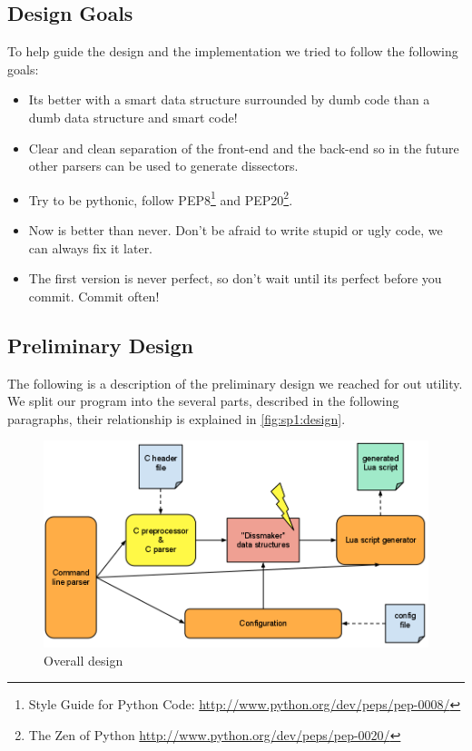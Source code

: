 \subsection{Design Goals}
To help guide the design and the implementation we tried to follow the
following goals:
\begin{itemize}
	\item Its better with a smart data structure surrounded by dumb code than
		a dumb data structure and smart code!
	\item Clear and clean separation of the front-end and the back-end so in the
		future other parsers can be used to generate dissectors.
	\item Try to be pythonic, follow
		PEP8\footnote{Style Guide for Python Code: \url{http://www.python.org/dev/peps/pep-0008/}} and
		PEP20\footnote{The Zen of Python \url{http://www.python.org/dev/peps/pep-0020/}}.
	\item Now is better than never. Don't be afraid to write stupid or ugly
		code, we can always fix it later.
	\item The first version is never perfect, so don't wait until its perfect
		before you commit. Commit often!
\end{itemize}

\subsection{Preliminary Design}
The following is a description of the preliminary design we reached for out
utility. We split our program into the several parts, described in the
following paragraphs, their relationship is explained in
\autoref{fig:sp1:design}.

\begin{figure}[!htb]
	\center
	\includegraphics[width=\textwidth]{./sprints/img/design}
	\caption{Overall design\label{fig:sp1:design}}
\end{figure}


